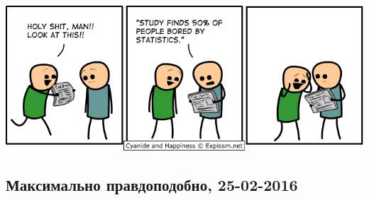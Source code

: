 \documentclass[12pt, a4paper]{article}\usepackage[]{graphicx}\usepackage[]{color}
\begin{document}
\begin{center}
\includegraphics[scale=0.6]{figures/50_bored.png}
\end{center}

\subsection{Максимально правдоподобно, 25-02-2016}
\end{document}
